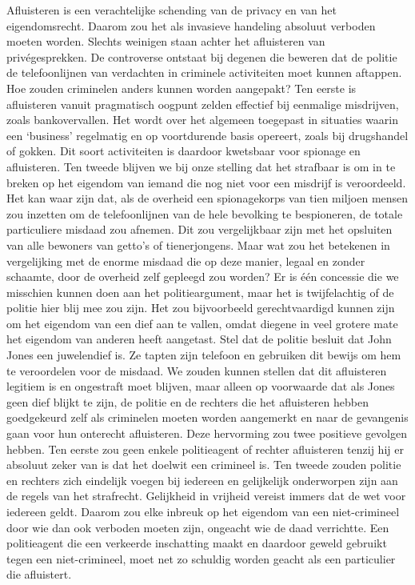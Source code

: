 \documentclass[
  a5paper,
  smalldemyvopaper,10pt,twoside,onecolumn,openright,extrafontsizes,hidelinks]{memoir}
\begin{document}
Afluisteren is een verachtelijke schending van de privacy en van het
eigendomsrecht. Daarom zou het als invasieve handeling absoluut verboden
moeten worden. Slechts weinigen staan achter het afluisteren van
privégesprekken. De controverse ontstaat bij degenen die beweren dat de
politie de telefoonlijnen van verdachten in criminele activiteiten moet
kunnen aftappen. Hoe zouden criminelen anders kunnen worden aangepakt?
Ten eerste is afluisteren vanuit pragmatisch oogpunt zelden effectief
bij eenmalige misdrijven, zoals bankovervallen. Het wordt over het
algemeen toegepast in situaties waarin een `business' regelmatig en op
voortdurende basis opereert, zoals bij drugshandel of gokken. Dit soort
activiteiten is daardoor kwetsbaar voor spionage en afluisteren. Ten
tweede blijven we bij onze stelling dat het strafbaar is om in te breken
op het eigendom van iemand die nog niet voor een misdrijf is
veroordeeld. Het kan waar zijn dat, als de overheid een spionagekorps
van tien miljoen mensen zou inzetten om de telefoonlijnen van de hele
bevolking te bespioneren, de totale particuliere misdaad zou afnemen.
Dit zou vergelijkbaar zijn met het opsluiten van alle bewoners van
getto's of tienerjongens. Maar wat zou het betekenen in vergelijking met
de enorme misdaad die op deze manier, legaal en zonder schaamte, door de
overheid zelf gepleegd zou worden? Er is één concessie die we misschien
kunnen doen aan het politieargument, maar het is twijfelachtig of de
politie hier blij mee zou zijn. Het zou bijvoorbeeld gerechtvaardigd
kunnen zijn om het eigendom van een dief aan te vallen, omdat diegene in
veel grotere mate het eigendom van anderen heeft aangetast. Stel dat de
politie besluit dat John Jones een juwelendief is. Ze tapten zijn
telefoon en gebruiken dit bewijs om hem te veroordelen voor de misdaad.
We zouden kunnen stellen dat dit afluisteren legitiem is en ongestraft
moet blijven, maar alleen op voorwaarde dat als Jones geen dief blijkt
te zijn, de politie en de rechters die het afluisteren hebben
goedgekeurd zelf als criminelen moeten worden aangemerkt en naar de
gevangenis gaan voor hun onterecht afluisteren. Deze hervorming zou twee
positieve gevolgen hebben. Ten eerste zou geen enkele politieagent of
rechter afluisteren tenzij hij er absoluut zeker van is dat het doelwit
een crimineel is. Ten tweede zouden politie en rechters zich eindelijk
voegen bij iedereen en gelijkelijk onderworpen zijn aan de regels van
het strafrecht. Gelijkheid in vrijheid vereist immers dat de wet voor
iedereen geldt. Daarom zou elke inbreuk op het eigendom van een
niet-crimineel door wie dan ook verboden moeten zijn, ongeacht wie de
daad verrichtte. Een politieagent die een verkeerde inschatting maakt en
daardoor geweld gebruikt tegen een niet-crimineel, moet net zo schuldig
worden geacht als een particulier die afluistert.
\end{document}
